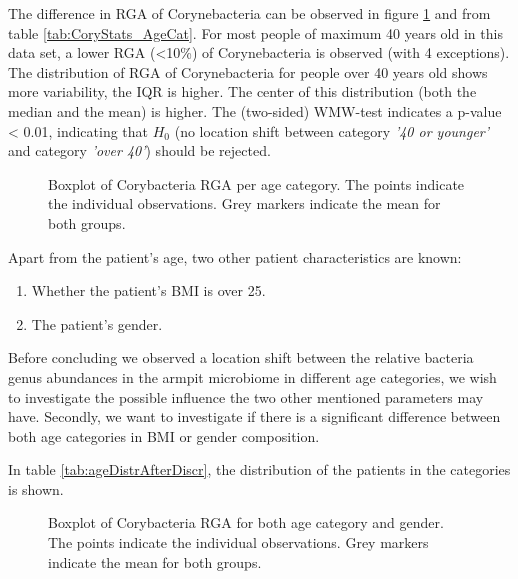 The difference in RGA of Corynebacteria can be observed in figure \ref{fig:BoxplotAge} and from table \ref{tab:CoryStats_AgeCat}.
For most people of maximum 40 years old in this data set, a lower RGA (<10\%) of Corynebacteria is observed (with 4 exceptions). 
The distribution of RGA of Corynebacteria for people over 40 years old shows more variability, the IQR is higher.
The center of this distribution (both the median and the mean) is higher.
The (two-sided) WMW-test indicates a p-value < 0.01, indicating that $H_0$ (no location shift between category \textit{'40 or younger'} and category \textit{'over 40'}) should be rejected.

\begin{figure}
    \centering
     \resizebox{\hsize}{!}{%
       
    }
    \caption{Boxplot of Corybacteria RGA per age category. The points indicate the individual observations. Grey markers indicate the mean for both groups.}
    \label{fig:BoxplotAge}
\end{figure}


Apart from the patient's age, two other patient characteristics are known:
\begin{enumerate}
    \item Whether the patient's BMI is over 25.
    \item The patient's gender.
\end{enumerate}



Before concluding we observed a location shift between the relative bacteria genus abundances in the armpit microbiome in different age categories, 
we wish to investigate the possible influence the two other mentioned parameters may have.
Secondly, we want to investigate if there is a significant difference between both age categories in BMI or gender composition.

In table \ref{tab:ageDistrAfterDiscr}, the distribution of the patients in the categories is shown.



\begin{figure}
    \centering
     \resizebox{\hsize}{!}{%
       
    }
    \caption{Boxplot of Corybacteria RGA for both age category and gender. The points indicate the individual observations. Grey markers indicate the mean for both groups.}
    \label{fig:BoxplotGenderAge}
\end{figure}

